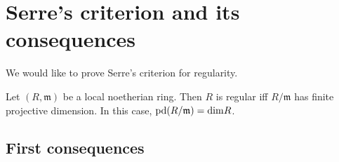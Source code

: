 \begin{comment}We shall eventually prove:

\begin{proposition}
Let $R = \mathbb{C}[X_1, \dots, X_n]/\mathfrak{p}$ for
$\mathfrak{p}$ prime.
Choose an injective map $\mathbb{C}[y_1, \dots, y_n]
\hookrightarrow R$ making $R$ a
finite module. Then $R$ is Cohen-Macaulay iff $R$ is projective
as a module
over $\mathbb{C}[y_1, \dots, y_n]$.\footnote{In fact, this is
equivalent to
freeness, although we will not prove it. Any projective finite
module over a
polynomial ring over a field is free, though this is a hard
theorem.}
\end{proposition}

The picture is that the inclusion $\mathbb{C}[y_1, \dots, y_m ]
\hookrightarrow
\mathbb{C}[x_1, \dots, x_n]/\mathfrak{p}$ corresponds to a map
\[ X \to \mathbb{C}^m  \]
for $X = V(\mathfrak{p}) \subset \mathbb{C}^n$. This statement
of freeness is a
statement about how the fibers of this finite map stay similar
in some sense.

\end{proof}
\end{comment}

\section{Serre's criterion and its consequences}


 We would like to prove
Serre's
criterion for regularity.

\begin{theorem}
Let $(R, \mathfrak{m})$ be a local noetherian ring. Then $R$ is
regular iff
$R/\mathfrak{m}$ has finite projective dimension. In this case,
$\mathrm{pd}(R/\mathfrak{m}) = \mathrm{dim} R$.
\end{theorem}



\subsection{First consequences}


